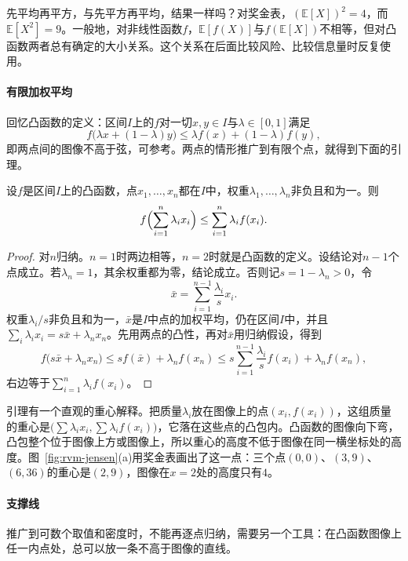 先平均再平方，与先平方再平均，结果一样吗？对奖金表，$(\mathbb{E}[X])^{2}=4$，而$\mathbb{E}[X^{2}]=9$。一般地，对非线性函数$f$，$\mathbb{E}[f(X)]$与$f(\mathbb{E}[X])$不相等，但对凸函数两者总有确定的大小关系。这个关系在后面比较风险、比较信息量时反复使用。

\paragraph{有限加权平均}
回忆凸函数的定义：区间$I$上的$f$对一切$x,y\in I$与$\lambda\in[0,1]$满足
\[
 f\bigl(\lambda x+(1-\lambda)y\bigr)\leq\lambda f(x)+(1-\lambda)f(y),
\]
即两点间的图像不高于弦，可参考。两点的情形推广到有限个点，就得到下面的引理。

\begin{lemma}[有限加权平均的凸性]
\label{lem:rvm-jensen-finite}
设$f$是区间$I$上的凸函数，点$x_1,\dots,x_n$都在$I$中，权重$\lambda_1,\dots,\lambda_n$非负且和为一。则
\begin{equation}
 f\Bigl(\sum_{i=1}^{n}\lambda_ix_i\Bigr)\leq\sum_{i=1}^{n}\lambda_if(x_i) .
 \label{eq:rvm-jensen-finite}
\end{equation}
\end{lemma}

\begin{proof}
对$n$归纳。$n=1$时两边相等，$n=2$时就是凸函数的定义。设结论对$n-1$个点成立。若$\lambda_n=1$，其余权重都为零，结论成立。否则记$s=1-\lambda_n>0$，令
\[
 \bar{x}=\sum_{i=1}^{n-1}\frac{\lambda_i}{s}x_i .
\]
权重$\lambda_i/s$非负且和为一，$\bar{x}$是$I$中点的加权平均，仍在区间$I$中，并且$\sum_{i}\lambda_ix_i=s\bar{x}+\lambda_nx_n$。先用两点的凸性，再对$\bar{x}$用归纳假设，得到
\[
 f\bigl(s\bar{x}+\lambda_nx_n\bigr)\leq sf(\bar{x})+\lambda_nf(x_n)\leq s\sum_{i=1}^{n-1}\frac{\lambda_i}{s}f(x_i)+\lambda_nf(x_n),
\]
右边等于$\sum_{i=1}^{n}\lambda_if(x_i)$。
\end{proof}

引理有一个直观的重心解释。把质量$\lambda_i$放在图像上的点$(x_i,f(x_i))$，这组质量的重心是$\bigl(\sum\lambda_ix_i,\sum\lambda_if(x_i)\bigr)$，它落在这些点的凸包内。凸函数的图像向下弯，凸包整个位于图像上方或图像上，所以重心的高度不低于图像在同一横坐标处的高度。图~\ref{fig:rvm-jensen}(a)用奖金表画出了这一点：三个点$(0,0)$、$(3,9)$、$(6,36)$的重心是$(2,9)$，图像在$x=2$处的高度只有$4$。

\paragraph{支撑线}
推广到可数个取值和密度时，不能再逐点归纳，需要另一个工具：在凸函数图像上任一内点处，总可以放一条不高于图像的直线。

